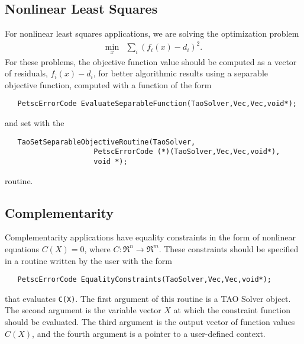 \subsection{Nonlinear Least Squares}\label{sec:evalsof}
For nonlinear least squares applications, we are solving
the optimization problem
\[
\begin{array}{ll}
\displaystyle \min_{x} & \displaystyle \sum_i (f_i(x) - d_i)^2.
\end{array}
\]
For these problems, the objective function value should be computed as a 
vector of residuals, $f_i(x) - d_i$, for better algorithmic results using 
a separable objective function, computed with a function of the form
\begin{verbatim}
   PetscErrorCode EvaluateSeparableFunction(TaoSolver,Vec,Vec,void*);
\end{verbatim}
and set with the
\begin{verbatim}
   TaoSetSeparableObjectiveRoutine(TaoSolver,
                     PetscErrorCode (*)(TaoSolver,Vec,Vec,void*),
                     void *);
\end{verbatim}
routine.

\begin{comment}
The computation of the Jacobian of the separable objective routine 
should be in a routine that looks like
\begin{verbatim}
   PetscErrorCode EvaluateJacobian(TaoSolver,Vec,Mat*,Mat*,MatStructure*,
                     void*);
\end{verbatim}
This function can be registered with TAO by using the function
\begin{verbatim}
   TaoSetJacobianRoutine(TaoSolver,Mat J, Mat Jpre,
                     PetscErrorCode (*)(TaoSolver,Vec,Mat*,Mat*,
                     MatStructure*,void*), void *);
\end{verbatim}
The first argument is the TAO solver object, the second and third arguments
are the Mat object where the Jacobian will be stored and the Mat object
that will be used for the preconditioning (they may be the same). The
fourth 
argument is the function that evaluates the Jacobian, 
and the fifth argument is a pointer to a user defined context,
cast as a {\tt void*} pointer.
\end{comment}



\subsection{Complementarity}
Complementarity applications have equality constraints in the form of 
nonlinear equations 
$C(X) = 0$, where $C: \Re^n \to \Re^m$.
These constraints should be specified in a 
routine written by the user with the form
\begin{verbatim}
   PetscErrorCode EqualityConstraints(TaoSolver,Vec,Vec,void*);
\end{verbatim}
that evaluates {\tt C(X)}.
\noindent
The first argument of this routine is a TAO Solver object.  The second argument
is the variable vector $X$ at which the constraint function should be 
evaluated.  
The third argument is the output vector of function values $C(X)$, and the fourth
argument is a pointer to a user-defined context.

